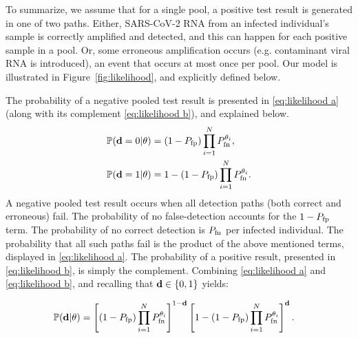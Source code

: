 \documentclass{article}
\begin{document}
To summarize, we assume that for a single pool, a positive test result
is generated in one of two paths. Either, SARS-CoV-2 RNA from an
infected individual's sample is correctly amplified and detected, and
this can happen for each positive sample in a pool. Or, some erroneous
amplification occurs (e.g. contaminant viral RNA is introduced), an
event that occurs at most once per pool. Our model is illustrated in
Figure~\ref{fig:likelihood}, and explicitly defined below. 

The probability of a negative pooled test result is presented in
\eqref{eq:likelihood a} (along with its complement
\eqref{eq:likelihood b}), and explained below.
\begin{subequations}
\begin{align}%
    \Pr(\data=0 | \theta) &= (1-\fp)\prod_{i=1}^N
    \fn^{\theta_i}, \label{eq:likelihood a}\\
    \Pr(\data=1 | \theta) &= 1 - (1-\fp)\prod_{i=1}^N \fn^{\theta_i}. \label{eq:likelihood b}
\end{align}
\end{subequations}
A negative pooled test result occurs when all detection paths (both
correct and erroneous) fail. The probability of no false-detection
accounts for the $1-P_{\text{fp}}$ term. The probability of no correct detection
is $P_{\text{fn}}$ per infected individual. The probability that all such paths
fail is the product of the above mentioned terms, displayed in
\eqref{eq:likelihood a}. The probability of a positive result,
presented in \eqref{eq:likelihood b}, is simply the complement.
Combining \eqref{eq:likelihood a} and \eqref{eq:likelihood b}, and
recalling that $\mathbf{d} \in \{0,1\}$ yields:

\begin{align}\label{eq:combined likelihood}
  \begin{split}
    \mathbb{P}(\mathbf{d}| \theta) &= \left [(1-P_{\text{fp}})\prod_{i=1}^N
      P_{\text{fn}}^{\theta_i} \right ]^{1-\mathbf{d}} \left [1 - (1-P_{\text{fp}})\prod_{i=1}^N P_{\text{fn}}^{\theta_i} \right ]^{\mathbf{d}}.
  \end{split}
\end{align}
\end{document}
